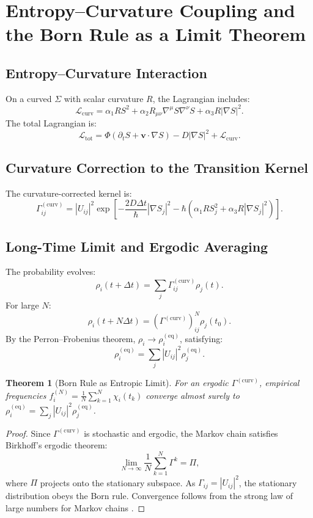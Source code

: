 \documentclass[12pt]{article}
\newtheorem{theorem}{Theorem}
\begin{document}
\section{Entropy–Curvature Coupling and the Born Rule as a Limit Theorem}

\subsection{Entropy–Curvature Interaction}

On a curved \(\Sigma\) with scalar curvature \(R\), the Lagrangian includes:
\[
\mathcal{L}_{\text{curv}} = \alpha_1 R S^2 + \alpha_2 R_{\mu\nu} \nabla^\mu S \nabla^\nu S + \alpha_3 R |\nabla S|^2.
\]
The total Lagrangian is:
\[
\mathcal{L}_{\text{tot}} = \Phi (\partial_t S + \mathbf{v} \cdot \nabla S) - D |\nabla S|^2 + \mathcal{L}_{\text{curv}}.
\]

\subsection{Curvature Correction to the Transition Kernel}

The curvature-corrected kernel is:
\[
\Gamma_{ij}^{(\mathrm{curv})} = |U_{ij}|^2 \exp\left[ -\frac{2 D \Delta t}{\hbar} |\nabla S_j|^2 - \hbar \left( \alpha_1 R S_j^2 + \alpha_3 R |\nabla S_j|^2 \right) \right].
\]

\subsection{Long-Time Limit and Ergodic Averaging}

The probability evolves:
\[
\rho_i(t + \Delta t) = \sum_j \Gamma_{ij}^{(\mathrm{curv})} \rho_j(t).
\]
For large \(N\):
\[
\rho_i(t + N \Delta t) = (\Gamma^{(\mathrm{curv})})^N_{ij} \rho_j(t_0).
\]
By the Perron–Frobenius theorem, \(\rho_i \to \rho_i^{(\mathrm{eq})}\), satisfying:
\[
\rho_i^{(\mathrm{eq})} = \sum_j |U_{ij}|^2 \rho_j^{(\mathrm{eq})}.
\]

\begin{theorem}[Born Rule as Entropic Limit]
\label{thm:bornlimit}
For an ergodic \(\Gamma^{(\mathrm{curv})}\), empirical frequencies \(f_i^{(N)} = \frac{1}{N} \sum_{k=1}^N \chi_i(t_k)\) converge almost surely to \(\rho_i^{(\mathrm{eq})} = \sum_j |U_{ij}|^2 \rho_j^{(\mathrm{eq})}\).
\end{theorem}

\begin{proof}
Since \(\Gamma^{(\mathrm{curv})}\) is stochastic and ergodic, the Markov chain satisfies Birkhoff’s ergodic theorem:
\[
\lim_{N \to \infty} \frac{1}{N} \sum_{k=1}^N \Gamma^k = \Pi,
\]
where \(\Pi\) projects onto the stationary subspace. As \(\Gamma_{ij} = |U_{ij}|^2\), the stationary distribution obeys the Born rule. Convergence follows from the strong law of large numbers for Markov chains \citep{Risken1996}.
\end{proof}
\end{document}
